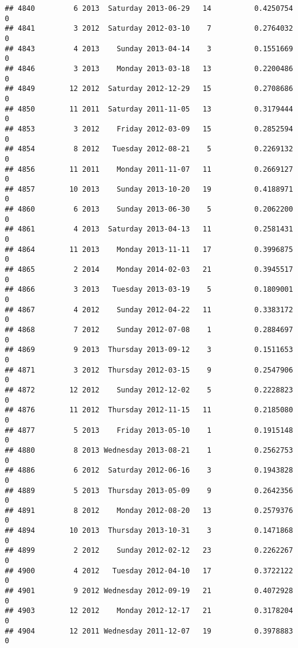 \documentclass[
]{article}
\begin{document}
\begin{verbatim}
## 4840         6 2013  Saturday 2013-06-29   14          0.4250754             0
## 4841         3 2012  Saturday 2012-03-10    7          0.2764032             0
## 4843         4 2013    Sunday 2013-04-14    3          0.1551669             0
## 4846         3 2013    Monday 2013-03-18   13          0.2200486             0
## 4849        12 2012  Saturday 2012-12-29   15          0.2708686             0
## 4850        11 2011  Saturday 2011-11-05   13          0.3179444             0
## 4853         3 2012    Friday 2012-03-09   15          0.2852594             0
## 4854         8 2012   Tuesday 2012-08-21    5          0.2269132             0
## 4856        11 2011    Monday 2011-11-07   11          0.2669127             0
## 4857        10 2013    Sunday 2013-10-20   19          0.4188971             0
## 4860         6 2013    Sunday 2013-06-30    5          0.2062200             0
## 4861         4 2013  Saturday 2013-04-13   11          0.2581431             0
## 4864        11 2013    Monday 2013-11-11   17          0.3996875             0
## 4865         2 2014    Monday 2014-02-03   21          0.3945517             0
## 4866         3 2013   Tuesday 2013-03-19    5          0.1809001             0
## 4867         4 2012    Sunday 2012-04-22   11          0.3383172             0
## 4868         7 2012    Sunday 2012-07-08    1          0.2884697             0
## 4869         9 2013  Thursday 2013-09-12    3          0.1511653             0
## 4871         3 2012  Thursday 2012-03-15    9          0.2547906             0
## 4872        12 2012    Sunday 2012-12-02    5          0.2228823             0
## 4876        11 2012  Thursday 2012-11-15   11          0.2185080             0
## 4877         5 2013    Friday 2013-05-10    1          0.1915148             0
## 4880         8 2013 Wednesday 2013-08-21    1          0.2562753             0
## 4886         6 2012  Saturday 2012-06-16    3          0.1943828             0
## 4889         5 2013  Thursday 2013-05-09    9          0.2642356             0
## 4891         8 2012    Monday 2012-08-20   13          0.2579376             0
## 4894        10 2013  Thursday 2013-10-31    3          0.1471868             0
## 4899         2 2012    Sunday 2012-02-12   23          0.2262267             0
## 4900         4 2012   Tuesday 2012-04-10   17          0.3722122             0
## 4901         9 2012 Wednesday 2012-09-19   21          0.4072928             0
## 4903        12 2012    Monday 2012-12-17   21          0.3178204             0
## 4904        12 2011 Wednesday 2011-12-07   19          0.3978883             0

\end{verbatim}
\end{document}
